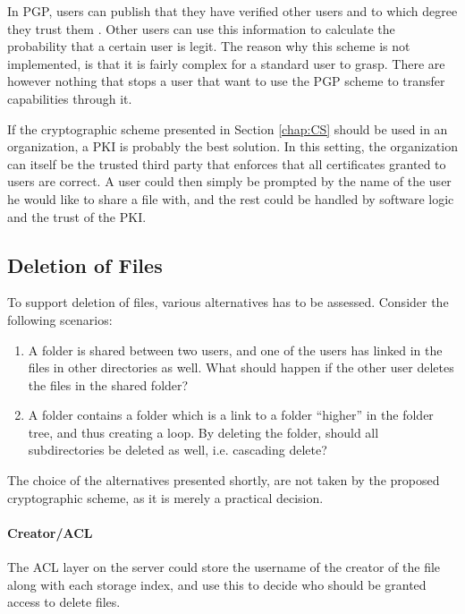 \documentclass[pdftex,english,10pt,b5paper,twoside]{book}
\begin{document}
In \ac{PGP}, users can publish that they have verified other users and to which
degree they trust them \cite{stallings}. Other users can use this information
to calculate the probability that a certain user is legit. The reason why this
scheme is not implemented, is that it is fairly complex for a standard user to
grasp. There are however nothing that stops a user that want to use the
\ac{PGP} scheme to transfer capabilities through it.

If the cryptographic scheme presented in Section \ref{chap:CS} should be used
in an organization, a \ac{PKI} is probably the best solution. In this setting,
the organization can itself be the trusted third party that enforces that all
certificates granted to users are correct. A user could then simply be prompted
by the name of the user he would like to share a file with, and the rest could
be handled by software logic and the trust of the \ac{PKI}.

\subsection{Deletion of Files}
\label{sec:deletion_of_files}
To support deletion of files, various alternatives has to be assessed.
Consider the following scenarios:

\begin{enumerate}
  \item A folder is shared between two users, and one of the users has
    linked in the files in other directories as well. What should happen if the
    other user deletes the files in the shared folder?

  \item A folder contains a folder which is a link to a folder ``higher''
    in the folder tree, and thus creating a loop. By deleting the folder,
    should all subdirectories be deleted as well, i.e. cascading delete?
\end{enumerate}

The choice of the alternatives presented shortly, are not taken by the proposed
cryptographic scheme, as it is merely a practical decision.

\paragraph{Creator/\ac{ACL}} The \ac{ACL} layer on the server could store the
username of the creator of the file along with each storage index, and use this
to decide who should be granted access to delete files.
\end{document}
